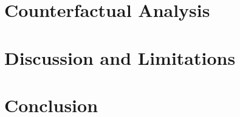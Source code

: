 \documentclass[12pt, a4paper]{article}
\begin{document}
\section{Counterfactual Analysis}\label{sec:counterfactual}


\section{Discussion and Limitations}\label{sec:discussion}


\section{Conclusion}\label{sec:conclusion}
\end{document}
